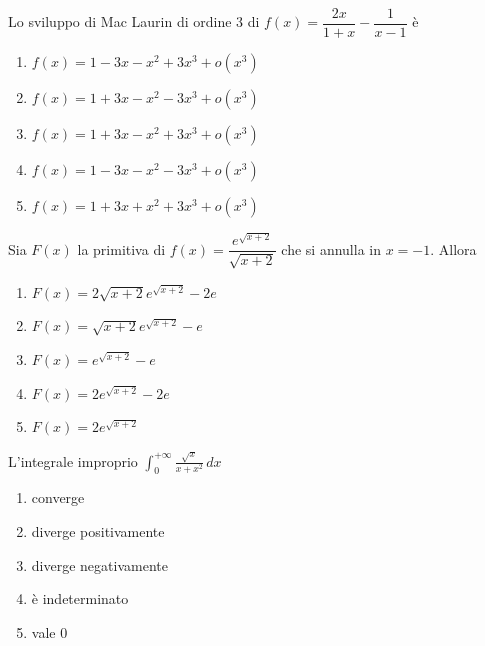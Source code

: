 \begin{quiz}
Lo sviluppo di Mac Laurin di ordine $3$ di $f(x)=\dfrac{2x}{1+x}-\dfrac1{x-1}$ \`e
\begin{enumerate}
\item $f(x)=1-3x-x^2+3x^3+o(x^3)$
\item $f(x)=1+3x-x^2-3x^3+o(x^3)$
\item $f(x)=1+3x-x^2+3x^3+o(x^3)$
\item $f(x)=1-3x-x^2-3x^3+o(x^3)$
\item $f(x)=1+3x+x^2+3x^3+o(x^3)$
\end{enumerate}
\end{quiz}

\begin{quiz}
Sia $F(x)$ la primitiva di $f(x)=\dfrac{e^{\sqrt{x+2}}}{\sqrt{x+2}}$ che si annulla in $x=-1$. Allora
\begin{enumerate}
\item $F(x)=2\sqrt{x+2}e^{\sqrt{x+2}}-2e$
\item $F(x)=\sqrt{x+2}e^{\sqrt{x+2}}-e$
\item $F(x)=e^{\sqrt{x+2}}-e$
\item $F(x)=2e^{\sqrt{x+2}}-2e$
\item $F(x)=2e^{\sqrt{x+2}}$
\end{enumerate}
\end{quiz}

\begin{quiz}
L'integrale improprio $\displaystyle\int_0^{+\infty}\frac{\sqrt{x}}{x+x^2}\,dx$
\begin{enumerate}
\item converge
\item diverge positivamente
\item diverge negativamente
\item \`e indeterminato
\item vale $0$
\end{enumerate}
\end{quiz}

